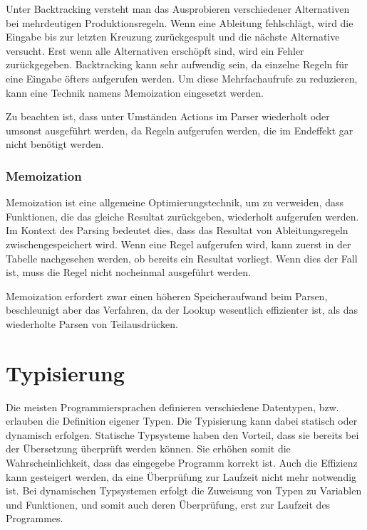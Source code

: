 Unter Backtracking versteht man das Ausprobieren verschiedener Alternativen bei mehrdeutigen Produktionsregeln. Wenn eine Ableitung fehlschlägt, wird die Eingabe bis zur letzten Kreuzung zurückgespult und die nächste Alternative versucht. Erst wenn alle Alternativen erschöpft sind, wird ein Fehler zurückgegeben. Backtracking kann sehr aufwendig sein, da einzelne Regeln für eine Eingabe öfters aufgerufen werden. Um diese Mehrfachaufrufe zu reduzieren, kann eine Technik namens Memoization eingesetzt werden.

Zu beachten ist, dass unter Umständen Actions im Parser wiederholt oder umsonst ausgeführt werden, da Regeln aufgerufen werden, die im Endeffekt gar nicht benötigt werden.

\subsubsection{Memoization}

Memoization ist eine allgemeine Optimierungstechnik, um zu verweiden, dass Funktionen, die das gleiche Resultat zurückgeben,  wiederholt aufgerufen werden. Im Kontext des Parsing bedeutet dies, dass das Resultat von Ab\-lei\-tungs\-re\-geln zwischengespeichert wird. Wenn eine Regel aufgerufen wird, kann zuerst in der Tabelle nachgesehen werden, ob bereits ein Resultat vorliegt. Wenn dies der Fall ist, muss die Regel nicht nocheinmal ausgeführt werden.

Memoization erfordert zwar einen höheren Speicheraufwand beim Parsen, beschleunigt aber das Verfahren, da der Lookup wesentlich effizienter ist, als das wiederholte Parsen von Teilausdrücken.

\section{Typisierung}

Die meisten Programmiersprachen definieren verschiedene Datentypen, bzw. erlauben die Definition eigener Typen. Die Typisierung kann dabei statisch oder dynamisch erfolgen. Statische Typsysteme haben den Vorteil, dass sie bereits bei der Übersetzung überprüft werden können. Sie erhöhen somit die Wahrscheinlichkeit, dass das eingegebe Programm korrekt ist. Auch die Effizienz kann gesteigert werden, da eine Überprüfung zur Laufzeit nicht mehr notwendig ist. Bei dynamischen Typsystemen erfolgt die Zuweisung von Typen zu Variablen und Funktionen, und somit auch deren Überprüfung, erst zur Laufzeit des Programmes.

